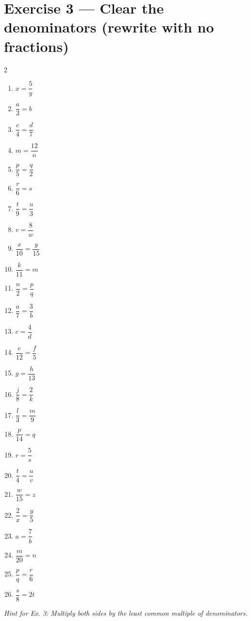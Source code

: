 \documentclass[12pt]{article}
\begin{document}
\section*{Exercise 3 — Clear the denominators (rewrite with no fractions)}
\begin{multicols}{2}
\begin{enumerate}
\item $x = \dfrac{5}{y}$
\item $\dfrac{a}{3} = b$
\item $\dfrac{c}{4} = \dfrac{d}{7}$
\item $m = \dfrac{12}{n}$
\item $\dfrac{p}{5} = \dfrac{q}{2}$
\item $\dfrac{r}{6} = s$
\item $\dfrac{t}{9} = \dfrac{u}{3}$
\item $v = \dfrac{8}{w}$
\item $\dfrac{x}{10} = \dfrac{y}{15}$
\item $\dfrac{k}{11} = m$
\item $\dfrac{n}{2} = \dfrac{p}{q}$
\item $\dfrac{a}{7} = \dfrac{3}{b}$
\item $c = \dfrac{4}{d}$
\item $\dfrac{e}{12} = \dfrac{f}{5}$
\item $g = \dfrac{h}{13}$
\item $\dfrac{j}{8} = \dfrac{2}{k}$
\item $\dfrac{l}{3} = \dfrac{m}{9}$
\item $\dfrac{p}{14} = q$
\item $r = \dfrac{5}{s}$
\item $\dfrac{t}{4} = \dfrac{u}{v}$
\item $\dfrac{w}{15} = z$
\item $\dfrac{2}{x} = \dfrac{y}{5}$
\item $a = \dfrac{7}{b}$
\item $\dfrac{m}{20} = n$
\item $\dfrac{p}{q} = \dfrac{r}{6}$
\item $\dfrac{s}{8} = 2t$
\end{enumerate}
\end{multicols}

\vfill
\small \textit{Hint for Ex. 3: Multiply both sides by the least common multiple of denominators.}

\newpage
\end{document}

